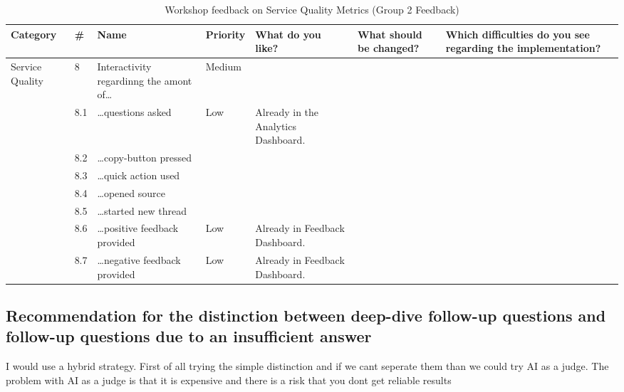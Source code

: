 \documentclass[
	english,
	ruledheaders=section,%
	class=report,%
	thesis={type=bachelor},%
	accentcolor=1b,%
	custommargins=true,%
	marginpar=false,%
	parskip=half-,%
	fontsize=11pt,%
	DIV=14,
]{tudapub}
\begin{document}
\begin{table}
    \centering
    \small 
    \caption{Workshop feedback on Service Quality Metrics (Group 2 Feedback)}
    \label{tab:service_quality_g2}
    \begin{tabularx}{\textheight}{p{2.2cm} l >{\RaggedRight\arraybackslash}X l >{\RaggedRight\arraybackslash}X >{\RaggedRight\arraybackslash}X >{\RaggedRight\arraybackslash}X}
        \toprule
        \textbf{Category} & \textbf{\#} & \textbf{Name} & \textbf{Priority} & \textbf{What do you like?} & \textbf{What should be changed?} & \textbf{Which difficulties do you see regarding the implementation?} \\
        \midrule

        \multirow{8}{=}{Service Quality} 
        & 8 & Interactivity regardinng the amont of\dots & Medium & & & \\
        \cmidrule(l){2-7}
        & 8.1 & \dots questions asked & Low & Already in the Analytics Dashboard. & & \\
        \cmidrule(l){2-7}
        & 8.2 & \dots copy-button pressed & & & & \\
        \cmidrule(l){2-7}
        & 8.3 & \dots quick action used & & & & \\
        \cmidrule(l){2-7}
        & 8.4 & \dots opened source & & & & \\
        \cmidrule(l){2-7}
        & 8.5 & \dots started new thread & & & & \\
        \cmidrule(l){2-7}
        & 8.6 & \dots positive feedback provided & Low & Already in Feedback Dashboard. & & \\
        \cmidrule(l){2-7}
        & 8.7 & \dots negative feedback provided & Low & Already in Feedback Dashboard. & & \\
        \bottomrule
    \end{tabularx}
\end{table}
\clearpage %
\subsection*{Recommendation for the distinction between deep-dive follow-up questions and follow-up questions due to an insufficient answer}
\label{section:recommendation-follow-ups}
I would use a hybrid strategy. First of all trying the simple distinction and if we cant seperate them than we could try AI as a judge. The problem with AI as a judge is that it is expensive and there is a risk that you dont get reliable results
\end{document}
